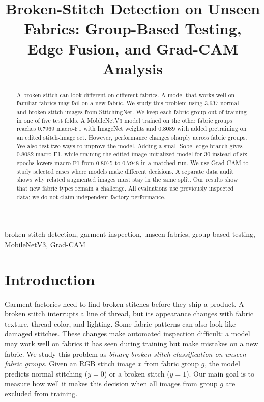 \documentclass[conference,a4paper]{IEEEtran}
\begin{document}
\title{Broken-Stitch Detection on Unseen Fabrics: Group-Based Testing, Edge Fusion, and Grad-CAM Analysis}
\author{}
\maketitle
\begin{abstract}
A broken stitch can look different on different fabrics. A model that works well on familiar fabrics may fail on a new fabric. We study this problem using 3,637 normal and broken-stitch images from StitchingNet. We keep each fabric group out of training in one of five test folds. A MobileNetV3 model trained on the other fabric groups reaches 0.7969 macro-F1 with ImageNet weights and 0.8089 with added pretraining on an edited stitch-image set. However, performance changes sharply across fabric groups. We also test two ways to improve the model. Adding a small Sobel edge branch gives 0.8082 macro-F1, while training the edited-image-initialized model for 30 instead of six epochs lowers macro-F1 from 0.8075 to 0.7948 in a matched run. We use Grad-CAM to study selected cases where models make different decisions. A separate data audit shows why related augmented images must stay in the same split. Our results show that new fabric types remain a challenge. All evaluations use previously inspected data; we do not claim independent factory performance.
\end{abstract}
\begin{IEEEkeywords}
broken-stitch detection, garment inspection, unseen fabrics, group-based testing, MobileNetV3, Grad-CAM
\end{IEEEkeywords}

\section{Introduction}
Garment factories need to find broken stitches before they ship a product. A broken stitch interrupts a line of thread, but its appearance changes with fabric texture, thread color, and lighting. Some fabric patterns can also look like damaged stitches. These changes make automated inspection difficult: a model may work well on fabrics it has seen during training but make mistakes on a new fabric. We study this problem as \emph{binary broken-stitch classification on unseen fabric groups}. Given an RGB stitch image $x$ from fabric group $g$, the model predicts normal stitching ($y=0$) or a broken stitch ($y=1$). Our main goal is to measure how well it makes this decision when all images from group $g$ are excluded from training.
\end{document}
